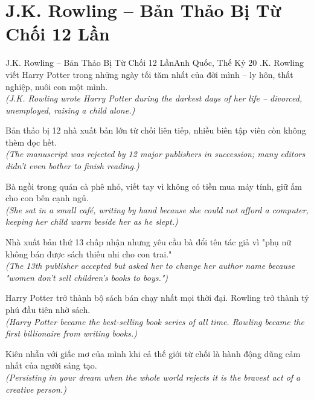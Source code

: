 \section{J.K. Rowling -- Bản Thảo Bị Từ Chối 12 Lần}
\begin{truyen}{J.K. Rowling -- Bản Thảo Bị Từ Chối 12 Lần}{Anh Quốc, Thế Kỷ 20}
.K. Rowling viết Harry Potter trong những ngày tối tăm nhất của đời mình -- ly hôn, thất nghiệp, nuôi con một mình.\\
\textit{(J.K. Rowling wrote Harry Potter during the darkest days of her life -- divorced, unemployed, raising a child alone.)}

Bản thảo bị 12 nhà xuất bản lớn từ chối liên tiếp, nhiều biên tập viên còn không thèm đọc hết.\\
\textit{(The manuscript was rejected by 12 major publishers in succession; many editors didn't even bother to finish reading.)}

Bà ngồi trong quán cà phê nhỏ, viết tay vì không có tiền mua máy tính, giữ ấm cho con bên cạnh ngủ.\\
\textit{(She sat in a small café, writing by hand because she could not afford a computer, keeping her child warm beside her as he slept.)}

Nhà xuất bản thứ 13 chấp nhận nhưng yêu cầu bà đổi tên tác giả vì "phụ nữ không bán được sách thiếu nhi cho con trai."\\
\textit{(The 13th publisher accepted but asked her to change her author name because "women don't sell children's books to boys.")}

Harry Potter trở thành bộ sách bán chạy nhất mọi thời đại. Rowling trở thành tỷ phú đầu tiên nhờ sách.\\
\textit{(Harry Potter became the best-selling book series of all time. Rowling became the first billionaire from writing books.)}

\end{truyen}
\begin{baihoc}
  Kiên nhẫn với giấc mơ của mình khi cả thế giới từ chối là hành động dũng cảm nhất của người sáng tạo.\\
  \textit{(Persisting in your dream when the whole world rejects it is the bravest act of a creative person.)}
\end{baihoc}

